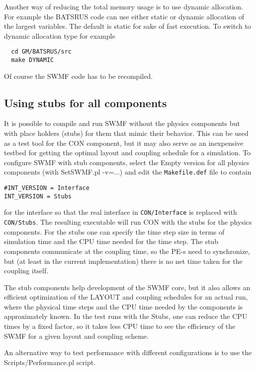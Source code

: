 Another way of reducing the total memory usage is to use dynamic
allocation. For example the BATSRUS code can use either static or
dynamic allocation of the largest variables. The default is static
for sake of fast execution. To switch to dynamic allocation type
for example
\begin{verbatim}
  cd GM/BATSRUS/src
  make DYNAMIC
\end{verbatim}
Of course the SWMF code has to be recompiled.

\subsection{Using stubs for all components}

It is possible to compile and run SWMF without the physics components
but with place holders (stubs) for them that mimic their behavior.
This can be used as a test tool for the CON component, but it may
also serve as an inexpensive testbed for getting the optimal layout
and coupling schedule for a simulation. To configure SWMF with 
stub components, select the Empty version for all physics components
(with SetSWMF.pl -v=...) and edit the {\tt Makefile.def} file to
contain
\begin{verbatim}
#INT_VERSION = Interface
INT_VERSION = Stubs
\end{verbatim}
for the interface so that the real interface in {\tt CON/Interface}
is replaced with {\tt CON/Stubs}.
The resulting executable will run CON with 
the stubs for the physics components. For the stubs one can
specify the time step size in terms of simulation time and the
CPU time needed for the time step. The stub components communicate
at the coupling time, so the PE-s need to synchronize, but 
(at least in the current implementation) there is no net time taken
for the coupling itself. 

The stub components help development of the SWMF core, but it also
allows an efficient optimization of the LAYOUT and coupling
schedules for an actual run, where the physical time steps
and the CPU time needed by the components is approximately known.
In the test runs with the Stubs, one can reduce the CPU times by 
a fixed factor, so it takes less CPU time to see the efficiency of the 
SWMF for a given layout and coupling scheme.

An alternative way to test performance with different configurations is
to use the Scripts/Performance.pl script.

